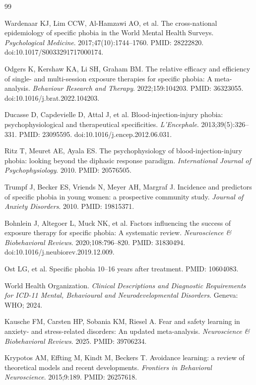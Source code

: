 \documentclass[11pt]{article}
\begin{document}
\begin{thebibliography}{99}

Wardenaar KJ, Lim CCW, Al-Hamzawi AO, et al. The cross-national epidemiology of specific phobia in the World Mental Health Surveys. \textit{Psychological Medicine}. 2017;47(10):1744--1760. PMID: 28222820. doi:10.1017/S0033291717000174.

Odgers K, Kershaw KA, Li SH, Graham BM. The relative efficacy and efficiency of single- and multi-session exposure therapies for specific phobia: A meta-analysis. \textit{Behaviour Research and Therapy}. 2022;159:104203. PMID: 36323055. doi:10.1016/j.brat.2022.104203.

Ducasse D, Capdevielle D, Attal J, et al. Blood-injection-injury phobia: psychophysiological and therapeutical specificities. \textit{L'Encephale}. 2013;39(5):326--331. PMID: 23095595. doi:10.1016/j.encep.2012.06.031.

Ritz T, Meuret AE, Ayala ES. The psychophysiology of blood-injection-injury phobia: looking beyond the diphasic response paradigm. \textit{International Journal of Psychophysiology}. 2010. PMID: 20576505.

Trumpf J, Becker ES, Vriends N, Meyer AH, Margraf J. Incidence and predictors of specific phobia in young women: a prospective community study. \textit{Journal of Anxiety Disorders}. 2010. PMID: 19815371.

Bohnlein J, Altegoer L, Muck NK, et al. Factors influencing the success of exposure therapy for specific phobia: A systematic review. \textit{Neuroscience \& Biobehavioral Reviews}. 2020;108:796--820. PMID: 31830494. doi:10.1016/j.neubiorev.2019.12.009.

Ost LG, et al. Specific phobia 10--16 years after treatment. PMID: 10604083.

World Health Organization. \textit{Clinical Descriptions and Diagnostic Requirements for ICD-11 Mental, Behavioural and Neurodevelopmental Disorders}. Geneva: WHO; 2024.

Kausche FM, Carsten HP, Sobania KM, Riesel A. Fear and safety learning in anxiety- and stress-related disorders: An updated meta-analysis. \textit{Neuroscience \& Biobehavioral Reviews}. 2025. PMID: 39706234.

Krypotos AM, Effting M, Kindt M, Beckers T. Avoidance learning: a review of theoretical models and recent developments. \textit{Frontiers in Behavioral Neuroscience}. 2015;9:189. PMID: 26257618.


\end{thebibliography}
\end{document}
